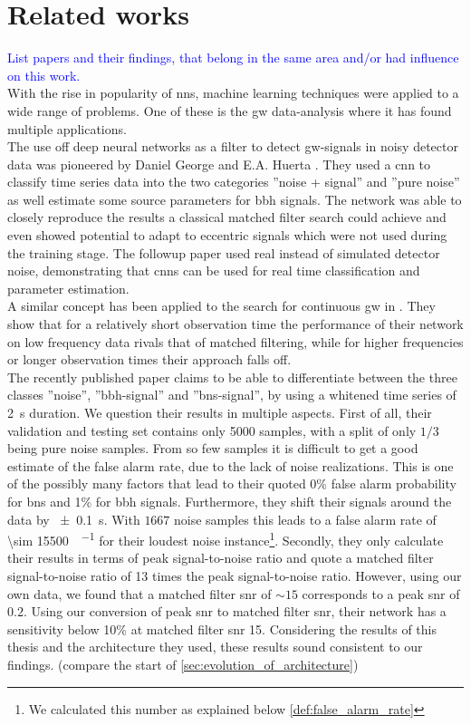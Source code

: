 \section{Related works}
\textcolor{blue}{List papers and their findings, that belong in the same area and/or had influence on this work.}\\
With the rise in popularity of \gls{nns}, machine learning techniques were applied to a wide range of problems. One of these is the \gls{gw} data-analysis where it has found multiple applications.\\
The use off deep neural networks as a filter to detect \gls{gw}-signals in noisy detector data was pioneered by Daniel George and E.A. Huerta \cite{original_deep_filtering}. They used a \gls{cnn} to classify time series data into the two categories ''noise + signal'' and ''pure noise'' as well estimate some source parameters for \gls{bbh} signals. The network was able to closely reproduce the results a classical matched filter search could achieve and even showed potential to adapt to eccentric signals which were not used during the training stage. The followup paper \cite{huerta_parameter_estimation} used real instead of simulated detector noise, demonstrating that \gls{cnns} can be used for real time classification and parameter estimation.\\
A similar concept has been applied to the search for continuous \gls{gw} in \cite{paper_christoph}. They show that for a relatively short observation time the performance of their network on low frequency data rivals that of matched filtering, while for higher frequencies or longer observation times their approach falls off.\\
The recently published paper \cite{bns_network} claims to be able to differentiate between the three classes ''noise'', ''\gls{bbh}-signal'' and ''\gls{bns}-signal'', by using a whitened time series of \SI{2}{\s} duration. We question their results in multiple aspects. First of all, their validation and testing set contains only 5000 samples, with a split of only $1/3$ being pure noise samples. From so few samples it is difficult to get a good estimate of the false alarm rate, due to the lack of noise realizations. This is one of the possibly many factors that lead to their quoted 0\% false alarm probability for \gls{bns} and 1\% for \gls{bbh} signals. Furthermore, they shift their signals around the data by \SI{\pm 0.1}{\s}. With $1667$ noise samples this leads to a false alarm rate of \SI[per-mode=fraction]{\sim 15500}{\samples\per\month} for their loudest noise instance\footnote{We calculated this number as explained below \eqref{def:false_alarm_rate}}. Secondly, they only calculate their results in terms of peak signal-to-noise ratio and quote a matched filter signal-to-noise ratio of 13 times the peak signal-to-noise ratio. However, using our own data, we found that a matched filter \gls{snr} of $\sim 15$ corresponds to a peak \gls{snr} of $0.2$. Using our conversion of peak \gls{snr} to matched filter \gls{snr}, their network has a sensitivity below 10\% at matched filter \gls{snr} 15. Considering the results of this thesis and the architecture they used, these results sound consistent to our findings. (compare the start of \autoref{sec:evolution_of_architecture})\smallskip\\
